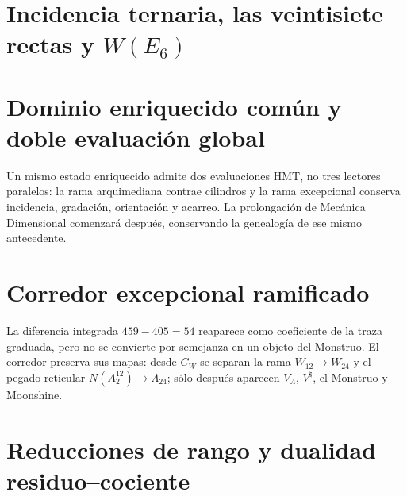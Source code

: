 \chapter{Incidencia ternaria, las veintisiete rectas y
\texorpdfstring{\(W(E_6)\)}{W(E6)}}
\label{chap:incidencia-e6-rev7}
\HMTDemoteHeadings


\HMTRestoreHeadings

\chapter{Dominio enriquecido común y doble evaluación global}
\label{chap:doble-evaluacion-rev7}
Un mismo estado enriquecido admite dos evaluaciones HMT, no tres lectores
paralelos: la rama arquimediana contrae cilindros y la rama excepcional
conserva incidencia, gradación, orientación y acarreo. La prolongación de
Mecánica Dimensional comenzará después, conservando la genealogía de ese
mismo antecedente.
\HMTDemoteHeadings





\HMTRestoreHeadings

\chapter{Corredor excepcional ramificado}
\label{chap:corredor-excepcional-rev7}
La diferencia integrada \(459-405=54\) reaparece como coeficiente de la traza
graduada, pero no se convierte por semejanza en un objeto del Monstruo. El
corredor preserva sus mapas: desde \(C_W\) se separan la rama
\(W_{12}\to W_{24}\) y el pegado reticular
\(N(A_2^{12})\to\Lambda_{24}\); sólo después aparecen
\(V_\Lambda\), \(V^\natural\), el Monstruo y Moonshine.
\HMTDemoteHeadings



\HMTRestoreHeadings

\chapter{Reducciones de rango y dualidad residuo--cociente}
\label{chap:pantallas-dualidad-rev7}
\HMTDemoteHeadings


\HMTRestoreHeadings

